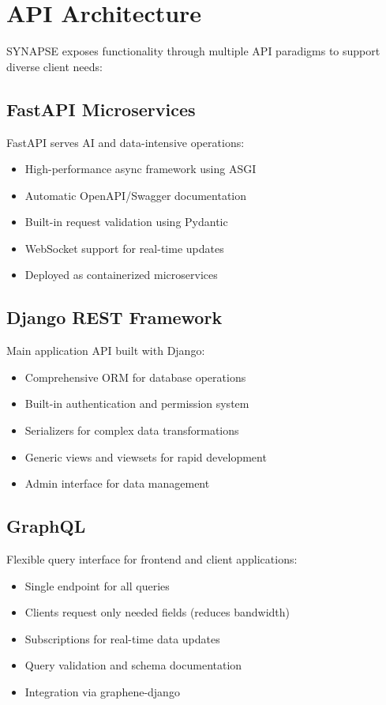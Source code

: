 \documentclass[12pt,a4paper]{report}
\begin{document}
\section{API Architecture}

SYNAPSE exposes functionality through multiple API paradigms to support diverse client needs:

\subsection{FastAPI Microservices}

FastAPI serves AI and data-intensive operations:

\begin{itemize}[label=\textbullet]
    \item High-performance async framework using ASGI
    \item Automatic OpenAPI/Swagger documentation
    \item Built-in request validation using Pydantic
    \item WebSocket support for real-time updates
    \item Deployed as containerized microservices
\end{itemize}

\subsection{Django REST Framework}

Main application API built with Django:

\begin{itemize}[label=\textbullet]
    \item Comprehensive ORM for database operations
    \item Built-in authentication and permission system
    \item Serializers for complex data transformations
    \item Generic views and viewsets for rapid development
    \item Admin interface for data management
\end{itemize}

\subsection{GraphQL}

Flexible query interface for frontend and client applications:

\begin{itemize}[label=\textbullet]
    \item Single endpoint for all queries
    \item Clients request only needed fields (reduces bandwidth)
    \item Subscriptions for real-time data updates
    \item Query validation and schema documentation
    \item Integration via graphene-django
\end{itemize}
\end{document}
